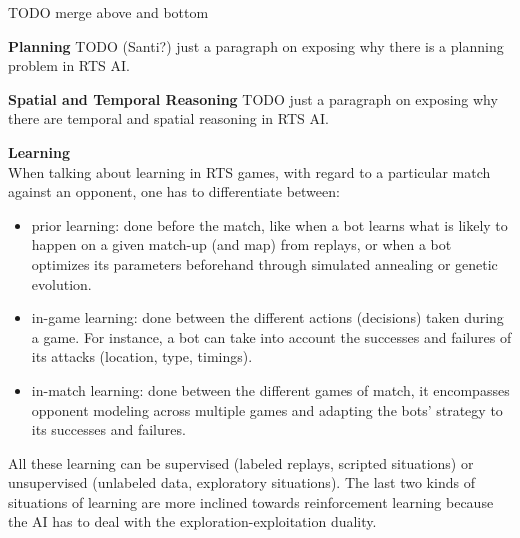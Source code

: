 \documentclass[journal]{IEEEtran}
\begin{document}
{\color{blue}
\begin{LARGE}
TODO merge above and bottom\\
\end{LARGE}
\textbf{Planning}
TODO (Santi?) just a paragraph on exposing why there is a planning problem in RTS AI.

\textbf{Spatial and Temporal Reasoning}
TODO just a paragraph on exposing why there are temporal and spatial reasoning in RTS AI.
}

\textbf{Learning}\\
When talking about learning in RTS games, with regard to a particular match against an opponent, one has to differentiate between:
\begin{itemize}
\item prior learning: done before the match, like when a bot learns what is likely to happen on a given match-up (and map) from replays, or when a bot optimizes its parameters beforehand through simulated annealing or genetic evolution.
\item in-game learning: done between the different actions (decisions) taken during a game. For instance, a bot can take into account the successes and failures of its attacks (location, type, timings).
\item in-match learning: done between the different games of match, it encompasses opponent modeling across multiple games and adapting the bots' strategy to its successes and failures.
\end{itemize}
All these learning can be supervised (labeled replays, scripted situations) or unsupervised (unlabeled data, exploratory situations). The last two kinds of situations of learning are more inclined towards reinforcement learning because the AI has to deal with the exploration-exploitation duality. %

\end{document}
